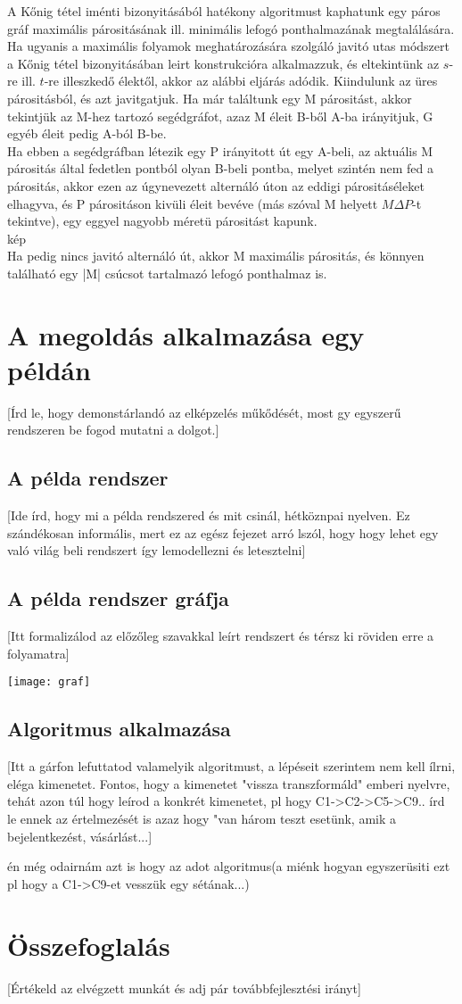 \documentclass[12pt]{article}
\begin{document}
A Kőnig tétel iménti bizonyitásából hatékony algoritmust kaphatunk egy páros gráf maximális párositásának ill. minimális lefogó ponthalmazának megtalálására. Ha ugyanis a maximális folyamok meghatározására szolgáló javitó utas módszert a Kőnig tétel bizonyitásában leirt konstrukcióra alkalmazzuk, és eltekintünk az $s$-re ill. $t$-re illeszkedő élektől, akkor az alábbi eljárás adódik. Kiindulunk az üres párositásból, és azt javitgatjuk. Ha már találtunk egy M párositást, akkor tekintjük az M-hez tartozó segédgráfot, azaz M éleit B-ből A-ba irányitjuk, G egyéb éleit pedig A-ból B-be.\\
Ha ebben a segédgráfban létezik egy P irányitott út egy A-beli, az aktuális M párositás által fedetlen pontból olyan B-beli pontba, melyet szintén nem fed a párositás, akkor ezen az úgynevezett alternáló úton az eddigi párositáséleket elhagyva, és P párositáson kivüli éleit bevéve (más szóval M helyett $M \Delta P$-t tekintve), egy eggyel nagyobb méretü párositást kapunk.\\
kép\\
Ha pedig nincs javitó alternáló út, akkor M maximális párositás, és könnyen található egy |M| csúcsot tartalmazó lefogó ponthalmaz is.


\section{A megoldás alkalmazása egy példán}
[Írd le, hogy demonstárlandó az elképzelés műkődését, most gy egyszerű rendszeren be fogod mutatni a dolgot.]

\subsection{A példa rendszer}
[Ide írd, hogy mi a példa rendszered és mit csinál, hétköznpai nyelven. Ez szándékosan informális, mert ez az egész fejezet arró lszól, hogy hogy lehet egy való világ beli rendszert így lemodellezni és letesztelni]

\subsection{A példa rendszer gráfja}
[Itt formalizálod az előzőleg szavakkal leírt rendszert és térsz ki röviden erre a folyamatra]

\texttt{[image: graf]}

\subsection{Algoritmus alkalmazása}
[Itt a gárfon lefuttatod valamelyik algoritmust, a lépéseit szerintem nem kell ílrni, eléga kimenetet. Fontos, hogy a kimenetet "vissza transzformáld" emberi nyelvre, tehát azon túl hogy leírod a konkrét kimenetet, pl hogy C1->C2->C5->C9..  írd le ennek az értelmezését is azaz hogy "van három teszt esetünk, amik a bejelentkezést, vásárlást...]

én még odairnám azt is hogy az adot algoritmus(a miénk hogyan egyszerüsiti ezt pl hogy a C1->C9-et vesszük egy sétának...)

\section{Összefoglalás}
[Értékeld az elvégzett munkát és adj pár továbbfejlesztési irányt]


\newpage


\end{document}
